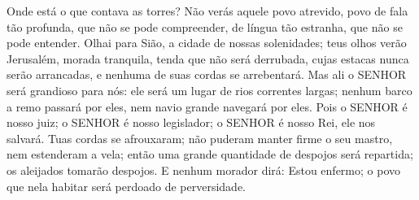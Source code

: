 { Onde está o que contava as torres?
Não verás
{} aquele povo atrevido, povo de fala tão profunda, que não se pode compreender, de língua tão estranha, que não se pode entender.
Olhai para Sião, a cidade de nossas solenidades; teus olhos verão Jerusalém, morada tranquila, tenda que não será derrubada, cujas estacas nunca serão arrancadas, e nenhuma de suas cordas se arrebentará.
Mas ali o SENHOR será grandioso para nós: ele será um lugar de rios
{} correntes largas; nenhum barco a remo passará por eles, nem navio grande navegará por eles.
Pois o SENHOR é nosso juiz; o SENHOR é nosso legislador; o SENHOR é nosso Rei, ele nos salvará.
Tuas cordas se afrouxaram; não puderam manter firme o seu mastro, nem estenderam a vela; então uma grande quantidade de despojos
 será repartida;
{} os aleijados tomarão despojos.
E nenhum morador dirá: Estou enfermo;
{} o povo que nela habitar será perdoado de
{} perversidade.

}
